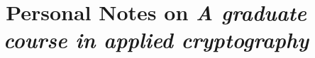 \documentclass{report}
\begin{document}
\title{Personal Notes on \em{A graduate course in applied cryptography}}
\maketitle
 
\tableofcontents 




\end{document}
